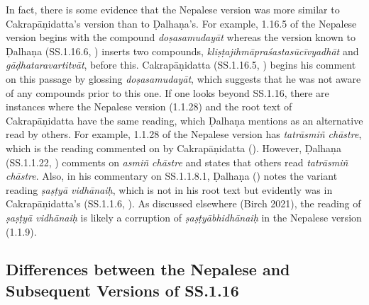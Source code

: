 
 

In fact, there is some evidence that the Nepalese version was more similar to Cakrapāṇidatta's version than to Ḍalhaṇa's. For example, 1.16.5 of the Nepalese version begins with the compound \emph{doṣasamudayāt} whereas the version known to Ḍalhaṇa (SS.1.16.6, \cite[77]{vulgate}) inserts two compounds, \emph{kliṣṭajihmāpraśastasūcīvyadhāt} and \emph{gāḍhataravartitvāt}, before this. Cakrapāṇidatta (SS.1.16.5, \cite[126–127]{acar-1939}) begins his comment on this passage by glossing \emph{doṣasamudayāt}, which suggests that he was not aware of any compounds prior to this one. If one looks beyond SS.1.16, there are instances where the Nepalese version (1.1.28) and the root text of Cakrapāṇidatta have the same reading, which Ḍalhaṇa mentions as an alternative read by others. For example, 1.1.28 of the Nepalese version has \emph{tatrāsmiñ chāstre}, which is the reading commented on by Cakrapāṇidatta (\cite[17]{acar-1939}). However, Ḍalhaṇa  (SS.1.1.22, \cite[5]{vulgate}) comments on \emph{asmiñ chāstre} and states that others read \emph{tatrāsmiñ chāstre}. Also, in his commentary on SS.1.1.8.1, Ḍalhaṇa (\cite[5]{vulgate}) notes the variant reading \emph{ṣaṣṭyā vidhānaiḥ}, which is not in his root text but evidently was in Cakrapāṇidatta's  (SS.1.1.6, \cite[11]{acar-1939}). As discussed elsewhere (Birch 2021), the reading of \emph{ṣaṣṭyā vidhānaiḥ} is likely a corruption of \emph{ṣaṣṭyābhidhānaiḥ} in the Nepalese version (1.1.9). 




 

\subsection{Differences between the Nepalese and Subsequent Versions of SS.1.16}

